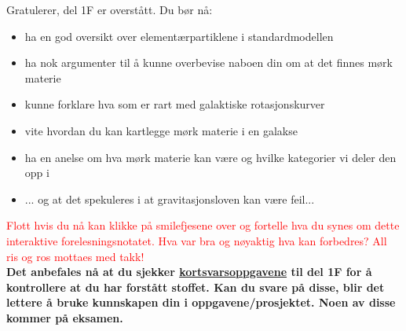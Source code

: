 \documentclass{beamer}
\let\hrefori\href
\renewcommand{\href}[2]{{\setlength{\fboxsep}{1pt}\colorbox{sunset}{\hrefori{#1}{#2}}}}
\newcommand{\pagebutton}[1]{\setbeamertemplate{button}{\tikz\node[inner xsep = 5pt, draw = structure!90, fill = green(ryb), rounded corners = 8pt]{\color{amber}\Large\insertbuttontext};}\beamerbutton{#1}}
\begin{document}
\begin{frame}
\label{oppsummering}
\hyperlink{hvamm7}{\pagebutton{\small Forrige side}}\href{https://nettskjema.no/a/160341}{ \Changey[1][yellow]{-2}}
Gratulerer, del 1F er overstått. Du bør nå:
\begin{itemize}
\item ha en god oversikt over elementærpartiklene i standardmodellen
\item ha nok argumenter til å kunne overbevise naboen din om at det finnes mørk materie
\item kunne forklare hva som er rart med galaktiske rotasjonskurver
\item vite hvordan du kan kartlegge mørk materie i en galakse
\item ha en anelse om hva mørk materie kan være og hvilke kategorier vi deler den opp i
\item ... og at det spekuleres i at gravitasjonsloven kan være feil...
\end{itemize}
\textcolor{red}{Flott hvis du nå kan klikke på smilefjesene over og fortelle hva du synes om dette interaktive forelesningsnotatet. Hva var bra og nøyaktig hva kan forbedres? All ris og ros mottaes med takk!}\\
{\bf Det anbefales nå at du sjekker \href{https://www.uio.no/studier/emner/matnat/astro/AST2000/h21/undervisningsmateriell/kortsvarsoppgaver/del1f.pdf}{kortsvarsoppgavene} til del 1F for å kontrollere at du har forstått stoffet. Kan du svare på disse, blir det lettere å bruke kunnskapen din i oppgavene/prosjektet. Noen av disse kommer på eksamen.}
\end{frame}
\end{document}

